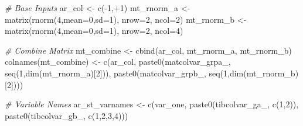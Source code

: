 \documentclass[
]{book}
\newenvironment{Shaded}{\begin{snugshade}}{\end{snugshade}}
\newcommand{\AttributeTok}[1]{\textcolor[rgb]{0.77,0.63,0.00}{#1}}
\newcommand{\CommentTok}[1]{\textcolor[rgb]{0.56,0.35,0.01}{\textit{#1}}}
\newcommand{\DecValTok}[1]{\textcolor[rgb]{0.00,0.00,0.81}{#1}}
\newcommand{\FunctionTok}[1]{\textcolor[rgb]{0.00,0.00,0.00}{#1}}
\newcommand{\NormalTok}[1]{#1}
\newcommand{\OtherTok}[1]{\textcolor[rgb]{0.56,0.35,0.01}{#1}}
\newcommand{\SpecialCharTok}[1]{\textcolor[rgb]{0.00,0.00,0.00}{#1}}
\newcommand{\StringTok}[1]{\textcolor[rgb]{0.31,0.60,0.02}{#1}}
\begin{document}
\begin{Shaded}
\begin{Highlighting}[]
\CommentTok{\# Base Inputs}
\NormalTok{ar\_col }\OtherTok{\textless{}{-}} \FunctionTok{c}\NormalTok{(}\SpecialCharTok{{-}}\DecValTok{1}\NormalTok{,}\SpecialCharTok{+}\DecValTok{1}\NormalTok{)}
\NormalTok{mt\_rnorm\_a }\OtherTok{\textless{}{-}} \FunctionTok{matrix}\NormalTok{(}\FunctionTok{rnorm}\NormalTok{(}\DecValTok{4}\NormalTok{,}\AttributeTok{mean=}\DecValTok{0}\NormalTok{,}\AttributeTok{sd=}\DecValTok{1}\NormalTok{), }\AttributeTok{nrow=}\DecValTok{2}\NormalTok{, }\AttributeTok{ncol=}\DecValTok{2}\NormalTok{)}
\NormalTok{mt\_rnorm\_b }\OtherTok{\textless{}{-}} \FunctionTok{matrix}\NormalTok{(}\FunctionTok{rnorm}\NormalTok{(}\DecValTok{4}\NormalTok{,}\AttributeTok{mean=}\DecValTok{0}\NormalTok{,}\AttributeTok{sd=}\DecValTok{1}\NormalTok{), }\AttributeTok{nrow=}\DecValTok{2}\NormalTok{, }\AttributeTok{ncol=}\DecValTok{4}\NormalTok{)}

\CommentTok{\# Combine Matrix}
\NormalTok{mt\_combine }\OtherTok{\textless{}{-}} \FunctionTok{cbind}\NormalTok{(ar\_col, mt\_rnorm\_a, mt\_rnorm\_b)}
\FunctionTok{colnames}\NormalTok{(mt\_combine) }\OtherTok{\textless{}{-}} \FunctionTok{c}\NormalTok{(}\StringTok{\textquotesingle{}ar\_col\textquotesingle{}}\NormalTok{,}
                          \FunctionTok{paste0}\NormalTok{(}\StringTok{\textquotesingle{}matcolvar\_grpa\_\textquotesingle{}}\NormalTok{, }\FunctionTok{seq}\NormalTok{(}\DecValTok{1}\NormalTok{,}\FunctionTok{dim}\NormalTok{(mt\_rnorm\_a)[}\DecValTok{2}\NormalTok{])),}
                          \FunctionTok{paste0}\NormalTok{(}\StringTok{\textquotesingle{}matcolvar\_grpb\_\textquotesingle{}}\NormalTok{, }\FunctionTok{seq}\NormalTok{(}\DecValTok{1}\NormalTok{,}\FunctionTok{dim}\NormalTok{(mt\_rnorm\_b)[}\DecValTok{2}\NormalTok{])))}

\CommentTok{\# Variable Names}
\NormalTok{ar\_st\_varnames }\OtherTok{\textless{}{-}} \FunctionTok{c}\NormalTok{(}\StringTok{\textquotesingle{}var\_one\textquotesingle{}}\NormalTok{,}
                    \FunctionTok{paste0}\NormalTok{(}\StringTok{\textquotesingle{}tibcolvar\_ga\_\textquotesingle{}}\NormalTok{, }\FunctionTok{c}\NormalTok{(}\DecValTok{1}\NormalTok{,}\DecValTok{2}\NormalTok{)),}
                    \FunctionTok{paste0}\NormalTok{(}\StringTok{\textquotesingle{}tibcolvar\_gb\_\textquotesingle{}}\NormalTok{, }\FunctionTok{c}\NormalTok{(}\DecValTok{1}\NormalTok{,}\DecValTok{2}\NormalTok{,}\DecValTok{3}\NormalTok{,}\DecValTok{4}\NormalTok{)))}


\end{Highlighting}
\end{Shaded}
\end{document}
